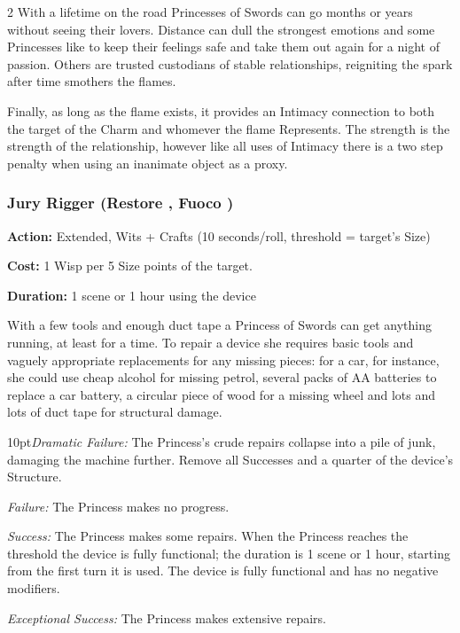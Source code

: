 \begin{multicols}{2}
With a lifetime on the road Princesses of Swords can go months or years without seeing their lovers. Distance can dull the strongest emotions and some Princesses like to keep their feelings safe and take them out again for a night of passion. Others are trusted custodians of stable relationships, reigniting the spark after time smothers the flames. 

Finally, as long as the flame exists, it provides an Intimacy connection to both the target of the Charm and whomever the flame Represents. The strength is the strength of the relationship, however like all uses of Intimacy there is a two step penalty when using an inanimate object as a proxy. 

\subsubsection*{Jury Rigger (Restore \textbullet\textbullet, Fuoco \textbullet)}

\noindent \textbf{Action:} Extended, Wits + Crafts (10 seconds/roll, threshold = target's Size)

\noindent \textbf{Cost:} 1 Wisp per 5 Size points of the target.

\noindent \textbf{Duration:} 1 scene or 1 hour using the device

With a few tools and enough duct tape a Princess of Swords can get anything running, at least for a time. To repair a device she requires basic tools and vaguely appropriate replacements for any missing pieces: for a car, for instance, she could use cheap alcohol for missing petrol, several packs of AA batteries to replace a car battery, a circular piece of wood for a missing wheel and lots and lots of duct tape for structural damage.

    \begin{myindentpar}{10pt}\emph{Dramatic Failure:} The Princess's crude repairs collapse into a pile of junk, damaging the machine further. Remove all Successes and a quarter of the device's Structure.

    \emph{Failure:} The Princess makes no progress.

    \emph{Success:} The Princess makes some repairs. When the Princess reaches the threshold the device is fully functional; the duration is 1 scene or 1 hour, starting from the first turn it is used. The device is fully functional and has no negative modifiers. 

    \emph{Exceptional Success:} The Princess makes extensive repairs.\end{myindentpar}


\end{multicols}
